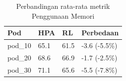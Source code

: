 \begin{table}[ht]
  \centering
  \caption{Perbandingan rata-rata metrik Penggunaan Memori}\label{tab:deskriptif-memory}
  \begin{tabular}{llll}
    \toprule
    Pod & HPA & RL & Perbedaan \\
    \midrule
    pod\_10 & 65.1 & 61.5 & -3.6 (-5.5\%) \\
    pod\_20 & 68.6 & 66.9 & -1.7 (-2.5\%) \\
    pod\_30 & 71.1 & 65.6 & -5.5 (-7.8\%) \\
    \bottomrule
  \end{tabular}
\end{table}